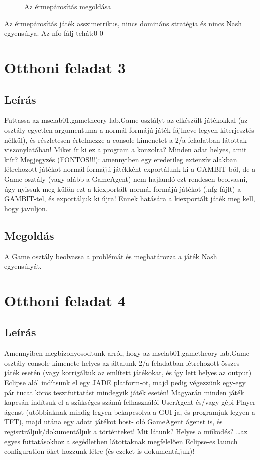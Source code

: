 \begin{itemize}
\begin{figure}[h]
\begin{center}
		\caption{Az érmepárosítás megoldása}
		\end{center}
		\end{figure}
Az érmepárosítás játék asszimetrikus, nincs domináns stratégia és nincs Nash egyensúlya.
Az nfo fálj tehát:0	0
\end{itemize}

\section{Otthoni feladat 3}
\subsection{Leírás}
Futtassa az msclab01.gametheory-lab.Game osztályt az elkészült játékokkal (az osztály egyetlen argumentuma a normál-formájú játék fájlneve legyen kiterjesztés nélkül), és részletesen értelmezze a console kimenetet a 2/a feladatban látottak viszonylatában! Miket ír ki ez a program a konzolra? Minden adat helyes, amit kiír? Megjegyzés (FONTOS!!!): amennyiben egy eredetileg extenzív alakban létrehozott játékot normál formájú játékként exportálunk ki a GAMBIT-ből, de a Game osztály (vagy alább a GameAgent) nem hajlandó ezt rendesen beolvasni, úgy nyissuk meg külön ezt a kiexportált normál formájú játékot (.nfg fájlt) a GAMBIT-tel, és exportáljuk ki újra! Ennek hatására a kiexportált játék meg kell, hogy javuljon.  
\subsection{Megoldás}
A Game osztály beolvassa a problémát és meghatározza a játék Nash egyensúlyát.


\section{Otthoni feladat 4}
\subsection{Leírás}
Amennyiben megbizonyosodtunk arról, hogy az msclab01.gametheory-lab.Game osztály console kimenete helyes az általunk 2/a feladatban létrehozott összes játék esetén (vagy korrigáltuk az említett játékokat, és így lett helyes az output) Eclipse alól indítsunk el egy JADE platform-ot, majd pedig végezzünk egy-egy pár tucat körös tesztfuttatást mindegyik játék esetén! Magyarán minden játék kapcsán indítsuk el a szükséges számú felhasználói UserAgent és/vagy gépi Player ágenst (utóbbiaknak mindig legyen bekapcsolva a GUI-ja, és programjuk legyen a TFT), majd utána egy adott játékot host- oló GameAgent ágenst is, és regisztráljuk/dokumentáljuk a történteket! Mit látunk? Helyes a működés? …az egyes futtatásokhoz a segédletben látottaknak megfelelően Eclipse-es launch configuration-őket hozzunk létre (és ezeket is dokumentáljuk)! 
